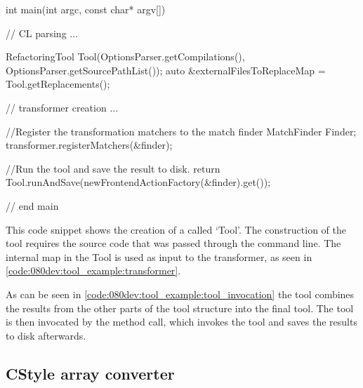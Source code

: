 \begin{listing}[H]
    \begin{cppcode}
int main(int argc, const char* argv[]) {
// CL parsing
...

RefactoringTool Tool(OptionsParser.getCompilations(),
                     OptionsParser.getSourcePathList());
auto &externalFilesToReplaceMap = Tool.getReplacements();

// transformer creation
...

//Register the transformation matchers to the match finder
MatchFinder Finder;
transformer.registerMatchers(&finder);

//Run the tool and save the result to disk.
return Tool.runAndSave(newFrontendActionFactory(&finder).get());
} // end main
    \end{cppcode}
    \caption{This code snippet shows the creation of a  called `Tool'. The construction of the tool requires the source code that was passed through the command line. The internal map in the Tool is used as input to the transformer, as seen in \cref{code:080dev:tool_example:transformer}.}
    \label{code:080dev:tool_example:tool_invocation}
\end{listing}

As can be seen in \cref{code:080dev:tool_example:tool_invocation} the tool combines the results from the other parts of the tool structure into the final tool. The tool is then invocated by the  method call, which invokes the tool and saves the results to disk afterwards. 

\subsection{CStyle array converter}